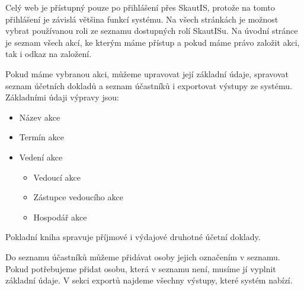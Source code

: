 \documentclass[thesis=B,czech]{FITthesis}[2011/06/14]
\begin{document}
Celý web je přístupný pouze po přihlášení přes SkautIS, protože na tomto přihlášení je závislá většina funkcí systému. Na všech stránkách je možnost vybrat používanou roli ze seznamu dostupných rolí SkautISu. Na úvodní stránce je seznam všech akcí, ke kterým máme přístup a pokud máme právo založit akci, tak i odkaz na založení.

Pokud máme vybranou akci, můžeme upravovat její základní údaje, spravovat seznam účetních dokladů a seznam účastníků i exportovat výstupy ze systému. Základními údaji výpravy jsou:
\begin{itemize}
	\item Název akce
	\item Termín akce
	\item Vedení akce
	\begin{itemize}
		\item Vedoucí akce
		\item Zástupce vedoucího akce
		\item Hospodář akce
	\end{itemize}
\end{itemize}

Pokladní kniha spravuje příjmové i výdajové druhotné účetní doklady. 

Do seznamu účastníků můžeme přidávat osoby jejich označením v seznamu. Pokud potřebujeme přidat osobu, která v seznamu není, musíme jí vyplnit základní údaje. V sekci exportů najdeme všechny výstupy, které systém nabízí.
    
\end{document}
